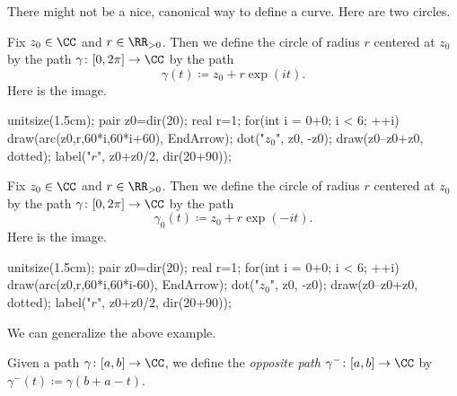 \documentclass[../notes.tex]{subfiles}
\begin{document}
There might not be a nice, canonical way to define a curve. Here are two circles.
\begin{example}
	Fix $z_0\in\CC$ and $r\in\RR_{>0}$. Then we define the circle of radius $r$ centered at $z_0$ by the path $\gamma\colon [0,2\pi]\to\CC$ by the path
	\[\gamma(t)\coloneqq z_0+r\exp(it).\]
	Here is the image.
	\begin{center}
		\begin{asy}
			unitsize(1.5cm);
			pair z0=dir(20);
			real r=1;
			for(int i = 0+0; i < 6; ++i)
				draw(arc(z0,r,60*i,60*i+60), EndArrow);
			dot("$z_0$", z0, -z0);
			draw(z0--z0+z0, dotted);
			label("$r$", z0+z0/2, dir(20+90));
		\end{asy}
	\end{center}
\end{example}
\begin{example}
	Fix $z_0\in\CC$ and $r\in\RR_{>0}$. Then we define the circle of radius $r$ centered at $z_0$ by the path $\gamma\colon [0,2\pi]\to\CC$ by the path
	\[\gamma_0(t)\coloneqq z_0+r\exp(-it).\]
	Here is the image.
	\begin{center}
		\begin{asy}
			unitsize(1.5cm);
			pair z0=dir(20);
			real r=1;
			for(int i = 0+0; i < 6; ++i)
				draw(arc(z0,r,60*i,60*i-60), EndArrow);
			dot("$z_0$", z0, -z0);
			draw(z0--z0+z0, dotted);
			label("$r$", z0+z0/2, dir(20+90));
		\end{asy}
	\end{center}
\end{example}
We can generalize the above example.
\begin{definition}
	Given a path $\gamma\colon [a,b]\to\CC$, we define the \textit{opposite path} $\gamma^-\colon [a,b]\to\CC$ by $\gamma^-(t)\coloneqq \gamma(b+a-t)$.
\end{definition}
\end{document}
